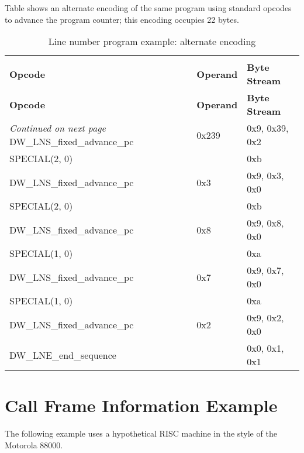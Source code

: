 Table 
shows an alternate 
encoding of the same program using 
standard opcodes to advance
the program counter; 
this encoding occupies 22 bytes.

\begin{centering}
\setlength{\extrarowheight}{0.1cm}
\begin{longtable}{lll}
  \caption{Line number program example: alternate encoding} \label{tab:linenumberprogramexamplealternateencoding} \\
  \hline \\ \bfseries Opcode &\bfseries Operand &\bfseries Byte Stream \\ \hline
\endfirsthead
  \bfseries Opcode &\bfseries Operand &\bfseries Byte Stream\\ \hline
\endhead
  \hline \emph{Continued on next page}
\endfoot
  \hline
\endlastfoot
DW\-\_LNS\-\_fixed\-\_advance\-\_pc&0x239&0x9, 0x39, 0x2        \\
SPECIAL(2, 0)&& 0xb        \\
DW\-\_LNS\-\_fixed\-\_advance\-\_pc&0x3&0x9, 0x3, 0x0        \\
SPECIAL(2, 0)&&0xb        \\
DW\-\_LNS\-\_fixed\-\_advance\-\_pc&0x8&0x9, 0x8, 0x0        \\
SPECIAL(1, 0)&& 0xa        \\
DW\-\_LNS\-\_fixed\-\_advance\-\_pc&0x7&0x9, 0x7, 0x0        \\
SPECIAL(1, 0) && 0xa        \\
DW\-\_LNS\-\_fixed\-\_advance\-\_pc&0x2&0x9, 0x2, 0x0        \\
DW\-\_LNE\-\_end\-\_sequence&&0x0, 0x1, 0x1        \\
\end{longtable}
\end{centering}


\section{Call Frame Information Example}
\label{app:callframeinformationexample}

The following example uses a hypothetical RISC machine in
the style of the Motorola 88000.

